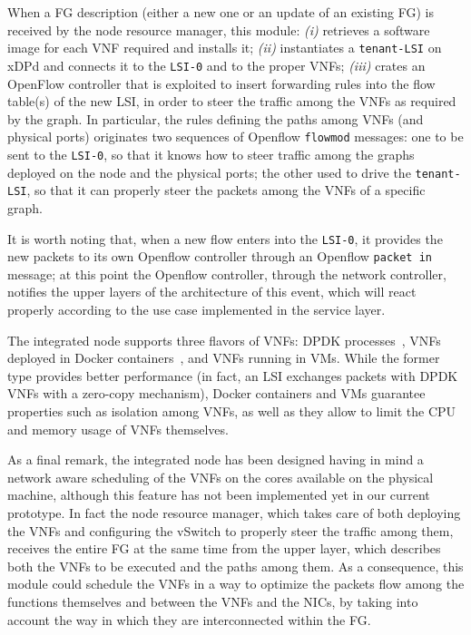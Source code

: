 When a FG description (either a new one or an update of an existing FG) is received by the node resource manager, this module:
\textit{(i)} retrieves a software image for each VNF required and installs it; \textit{(ii)} instantiates a \texttt{tenant-LSI} on xDPd and connects it to the \texttt{LSI-0} and to the proper VNFs; \textit{(iii)} crates an OpenFlow controller that is exploited to insert forwarding rules into the flow table(s) of the new LSI, in order to steer the traffic among the VNFs as required by the graph.
In particular, the rules defining the paths among VNFs (and physical ports) originates two sequences of Openflow \texttt{flowmod} messages: one to be sent to the \texttt{LSI-0}, so that it knows %
how to steer traffic among the graphs deployed on the node and the physical ports; the other used to drive the \texttt{tenant-LSI}, so that it can properly steer the packets among the VNFs of a specific graph.

It is worth noting that, when a new flow enters into the \texttt{LSI-0}, it provides the new packets to its own Openflow controller through an Openflow \texttt{packet in} message; at this point the Openflow controller, through the network controller, notifies the upper layers of the architecture of this event, which will react properly according to the use case implemented in the service layer.

The integrated node supports three flavors of VNFs: DPDK processes~\cite{dpdk}, VNFs deployed in Docker containers~\cite{docker}, and VNFs running in VMs.
While the former type provides better performance (in fact, an LSI exchanges packets with DPDK VNFs with a zero-copy mechanism), Docker containers and VMs guarantee properties such as isolation among VNFs, as well as they allow to limit the CPU and memory usage of VNFs themselves. 

As a final remark, the integrated node has been designed having in mind a network aware scheduling of the VNFs on the cores available on the physical machine, although this feature has not been implemented yet in our current prototype.
In fact the node resource manager, which takes care of both deploying the VNFs and configuring the vSwitch to properly steer the traffic among them, receives the entire FG at the same time from the upper layer, which describes both the VNFs to be executed and the paths among them.
As a consequence, this module could schedule the VNFs in a way to optimize the packets flow among the functions themselves and between the VNFs and the NICs, by taking into account the way in which they are interconnected within the FG.



















